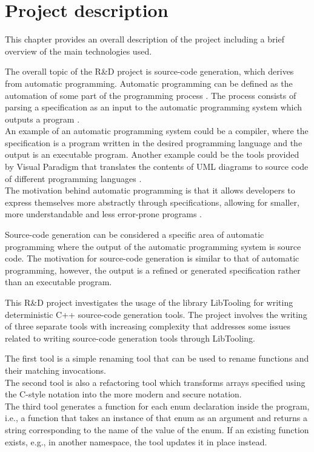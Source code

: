 \chapter{Project description}
This chapter provides an overall description of the project including a brief overview of the main technologies used.

The overall topic of the R\&D project is source-code generation, which derives from automatic programming. Automatic programming can be defined as the automation of some part of the programming process \cite{barrAutomaticProgramming1982}. The process consists of parsing a specification as an input to the automatic programming system which outputs a program \cite{novakjr.CS394PAutomatic}.\\
An example of an automatic programming system could be a compiler, where the specification is a program written in the desired programming language and the output is an executable program. Another example could be the tools provided by Visual Paradigm that translates the contents of UML diagrams to source code of different programming languages \cite{visualparadigmUMLCodeGeneration}.\\
The motivation behind automatic programming is that it allows developers to express themselves more abstractly through specifications, allowing for smaller, more understandable and less error-prone programs \cite{novakjr.CS394PAutomatic}.

Source-code generation can be considered a specific area of automatic programming where the output of the automatic programming system is source code. 
The motivation for source-code generation is similar to that of automatic programming, however, the output is a refined or generated specification rather than an executable program.

This R\&D project investigates the usage of the library LibTooling for writing deterministic C++ source-code generation tools. The project involves the writing of three separate tools with increasing complexity that addresses some issues related to writing source-code generation tools through LibTooling.

The first tool is a simple renaming tool that can be used to rename functions and their matching invocations.\\
The second tool is also a refactoring tool which transforms arrays specified using the C-style notation into the more modern and secure  notation. \\
The third tool generates a  function for each enum declaration inside the program, i.e., a function that takes an instance of that enum as an argument and returns a string corresponding to the name of the value of the enum. If an existing  function exists, e.g., in another namespace, the tool updates it in place instead.

